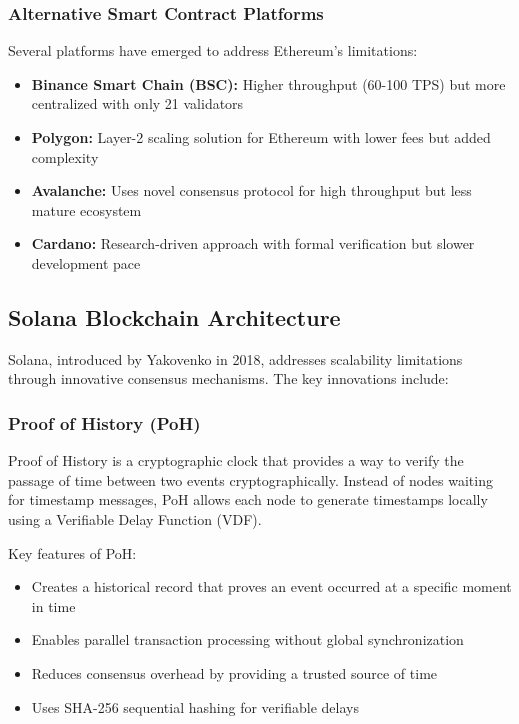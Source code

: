 \documentclass[a4paper,13pt,twoside]{report}
\theoremstyle{definition}
\begin{document}
\subsubsection{Alternative Smart Contract Platforms}

Several platforms have emerged to address Ethereum's limitations:

\begin{itemize}
    \item \textbf{Binance Smart Chain (BSC):} Higher throughput (60-100 TPS) but more centralized with only 21 validators
    \item \textbf{Polygon:} Layer-2 scaling solution for Ethereum with lower fees but added complexity
    \item \textbf{Avalanche:} Uses novel consensus protocol for high throughput but less mature ecosystem
    \item \textbf{Cardano:} Research-driven approach with formal verification but slower development pace
\end{itemize}

\subsection{Solana Blockchain Architecture}

Solana, introduced by Yakovenko in 2018\cite{yakovenko2018solana}, addresses scalability limitations through innovative consensus mechanisms. The key innovations include:

\subsubsection{Proof of History (PoH)}

Proof of History is a cryptographic clock that provides a way to verify the passage of time between two events cryptographically. Instead of nodes waiting for timestamp messages, PoH allows each node to generate timestamps locally using a Verifiable Delay Function (VDF).

Key features of PoH:
\begin{itemize}
    \item Creates a historical record that proves an event occurred at a specific moment in time
    \item Enables parallel transaction processing without global synchronization
    \item Reduces consensus overhead by providing a trusted source of time
    \item Uses SHA-256 sequential hashing for verifiable delays
\end{itemize}
\end{document}
